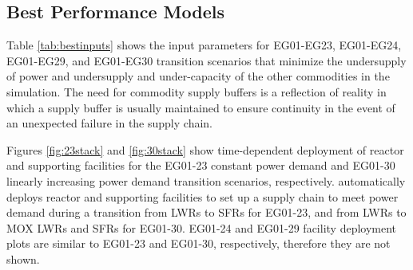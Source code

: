 \subsection{Best Performance Models}
Table \ref{tab:bestinputs} shows the \deploy input parameters for
EG01-EG23, EG01-EG24, EG01-EG29, and EG01-EG30 transition scenarios
that minimize the undersupply of power and 
undersupply and under-capacity of the other commodities
in the simulation. 
The need for commodity supply buffers is a reflection of reality
in which a supply buffer is usually maintained to ensure 
continuity in the event of an unexpected failure in the supply chain.

Figures \ref{fig:23stack} and \ref{fig:30stack} show
time-dependent deployment of reactor and supporting facilities for 
the EG01-23 constant power demand and EG01-30 linearly increasing power demand 
transition scenarios, respectively. 
\deploy automatically deploys reactor and supporting facilities 
to set up a supply chain to meet power demand
during a transition from \glspl{LWR} to \glspl{SFR} for EG01-23, 
and from \glspl{LWR} to \gls{MOX} \glspl{LWR} and \glspl{SFR} for 
EG01-30. 
EG01-24 and EG01-29 facility deployment plots are similar to 
EG01-23 and EG01-30, respectively, therefore they are not shown. 

